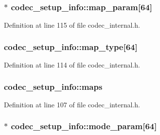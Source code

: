 \subsubsection[{\texorpdfstring{map\+\_\+param}{map_param}}]{$\ast$ codec\+\_\+setup\+\_\+info\+::map\+\_\+param\mbox{[}64\mbox{]}}\hypertarget{structcodec__setup__info_ac1ba2acf8ad63b29d8889920c43d2549}{}\label{structcodec__setup__info_ac1ba2acf8ad63b29d8889920c43d2549}


Definition at line 115 of file codec\+\_\+internal.\+h.

\subsubsection[{\texorpdfstring{map\+\_\+type}{map_type}}]{ codec\+\_\+setup\+\_\+info\+::map\+\_\+type\mbox{[}64\mbox{]}}\hypertarget{structcodec__setup__info_aa186f9b80f56c5b09a68598da505b5e2}{}\label{structcodec__setup__info_aa186f9b80f56c5b09a68598da505b5e2}


Definition at line 114 of file codec\+\_\+internal.\+h.

\subsubsection[{\texorpdfstring{maps}{maps}}]{ codec\+\_\+setup\+\_\+info\+::maps}\hypertarget{structcodec__setup__info_a0631814413bb5e4cad9d6c34abea2d25}{}\label{structcodec__setup__info_a0631814413bb5e4cad9d6c34abea2d25}


Definition at line 107 of file codec\+\_\+internal.\+h.

\subsubsection[{\texorpdfstring{mode\+\_\+param}{mode_param}}]{$\ast$ codec\+\_\+setup\+\_\+info\+::mode\+\_\+param\mbox{[}64\mbox{]}}\hypertarget{structcodec__setup__info_a40fc25e41a2e10422b5004f322d1d110}{}\label{structcodec__setup__info_a40fc25e41a2e10422b5004f322d1d110}


